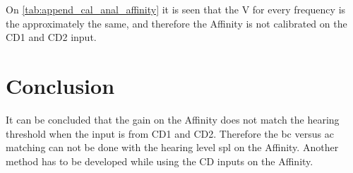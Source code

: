 On  \autoref{tab:append_cal_anal_affinity} it is seen that the  \si{\volt}  for every frequency is the approximately the same, and therefore the Affinity is not calibrated on the CD1 and CD2 input.

\section*{Conclusion}
It can be concluded that the gain on the Affinity does not match the hearing threshold when the input is from CD1 and CD2. Therefore the \gls{bc} versus \gls{ac} matching can not be done with the hearing level \gls{spl} on the Affinity. Another method has to be developed while using the CD inputs on the Affinity.




